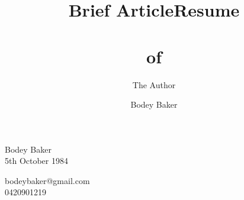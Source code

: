\documentclass[10pt, a4paper]{report}
\title{Brief Article}
\author{The Author}
\title{Resume\\~\\of}
\author{Bodey Baker}%
\begin{document}
\pagestyle{empty}




\begin{minipage}[t]{14.5cm}
{\LARGE Bodey Baker} \\
5th October 1984
\end{minipage} 
\hfill
\begin{minipage}[t]{12em}
\begin{flushright}
bodeybaker@gmail.com\\
0420901219
\end{flushright}
\end{minipage}
\end{document}

